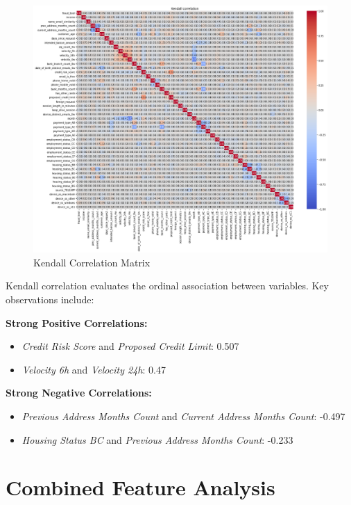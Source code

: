 \documentclass[12pt,a4paper]{report}
\begin{document}
\begin{figure}[h]
    \centering
    \includegraphics[width=\textwidth]{kendall_corr.png}
    \caption{Kendall Correlation Matrix}
    \label{fig:kendall_corr}
\end{figure}

Kendall correlation evaluates the ordinal association between variables. Key observations include:

\textbf{Strong Positive Correlations:}
\begin{itemize}
    \item \textit{Credit Risk Score} and \textit{Proposed Credit Limit}: 0.507
    \item \textit{Velocity 6h} and \textit{Velocity 24h}: 0.47
\end{itemize}

\textbf{Strong Negative Correlations:}
\begin{itemize}
    \item \textit{Previous Address Months Count} and \textit{Current Address Months Count}: -0.497
    \item \textit{Housing Status BC} and \textit{Previous Address Months Count}: -0.233
\end{itemize}







\section{Combined Feature Analysis}
\end{document}
